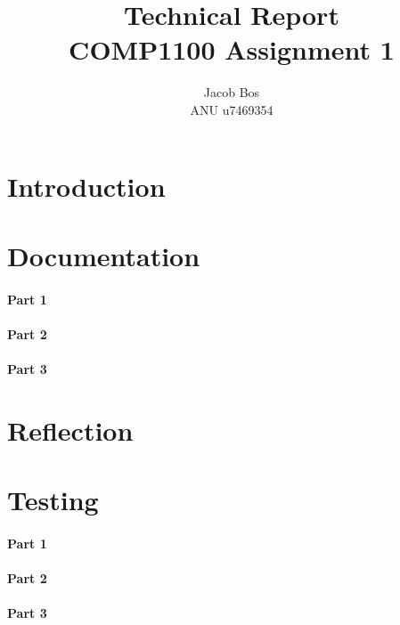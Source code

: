 \documentclass[11pt]{article}
\title{Technical Report\\ COMP1100 Assignment 1}
\author{Jacob Bos\\ ANU u7469354}
\begin{document}
\maketitle
\section*{Introduction} 



\section{Documentation}%
\paragraph{Part 1}
\paragraph{Part 2}
\paragraph{Part 3}


\section{Reflection}%



\section{Testing}%
\paragraph{Part 1}
\paragraph{Part 2}
\paragraph{Part 3}



\end{document}
